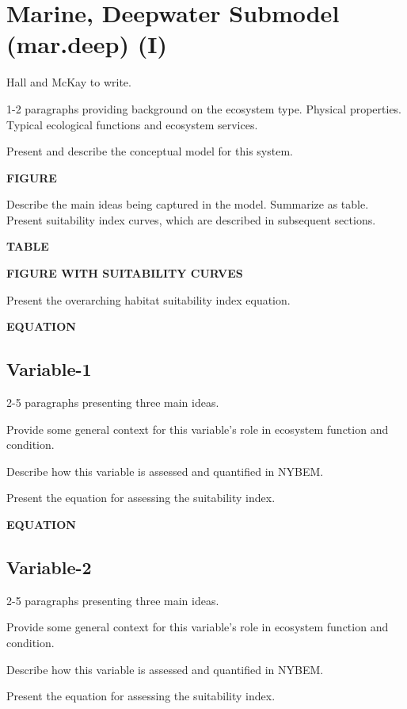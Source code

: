 \documentclass[
]{book}
\begin{document}
\hypertarget{marine-deepwater-submodel-mar.deep-i}{%
\section{Marine, Deepwater Submodel (mar.deep) (I)}\label{marine-deepwater-submodel-mar.deep-i}}

{Hall and McKay to write.}

1-2 paragraphs providing background on the ecosystem type. Physical properties. Typical ecological functions and ecosystem services.

Present and describe the conceptual model for this system.

\textbf{FIGURE}

Describe the main ideas being captured in the model. Summarize as table. Present suitability index curves, which are described in subsequent sections.

\textbf{TABLE}

\textbf{FIGURE WITH SUITABILITY CURVES}

Present the overarching habitat suitability index equation.

\textbf{EQUATION}

\hypertarget{variable-1-6}{%
\subsection{Variable-1}\label{variable-1-6}}

2-5 paragraphs presenting three main ideas.

Provide some general context for this variable's role in ecosystem function and condition.

Describe how this variable is assessed and quantified in NYBEM.

Present the equation for assessing the suitability index.

\textbf{EQUATION}

\hypertarget{variable-2-4}{%
\subsection{Variable-2}\label{variable-2-4}}

2-5 paragraphs presenting three main ideas.

Provide some general context for this variable's role in ecosystem function and condition.

Describe how this variable is assessed and quantified in NYBEM.

Present the equation for assessing the suitability index.
\end{document}
